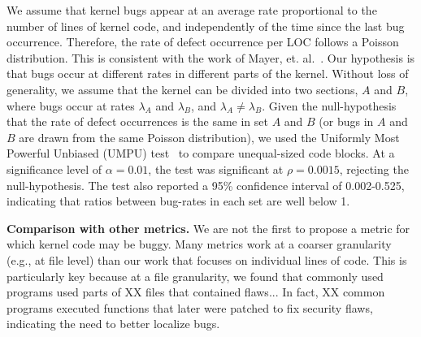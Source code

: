 We assume that kernel bugs appear at an average rate proportional to the
number of lines of kernel code, and independently of the time since the last
bug occurrence. Therefore, the rate of defect occurrence per LOC
follows a Poisson distribution.
This is consistent with the work of Mayer, et. al.~\cite{mayer1989probability}.
Our hypothesis is that bugs occur at different rates in different parts of the kernel. Without
loss of generality, we assume that the kernel can be divided into two sections,
$A$ and $B$, where bugs occur at rates $\lambda_A$ and
$\lambda_B$, and $\lambda_A \neq \lambda_B$. Given the null-hypothesis
that the rate of defect occurrences is the same in set $A$ and $B$
(or bugs in $A$ and $B$ are drawn from the same Poisson distribution),
we used the Uniformly Most Powerful Unbiased (UMPU) test~\cite{shiue1982experiment}
to compare unequal-sized code blocks.
At a significance level of $\alpha=0.01$, the test was significant at
$\rho=0.0015$, rejecting the null-hypothesis.
The test also reported a 95\% confidence interval of
0.002-0.525, indicating that ratios between bug-rates in each set are well
below 1. 

\textbf{Comparison with other metrics.}
We are not the first to propose a metric for which kernel code may be buggy.
Many metrics work at a coarser granularity (e.g., at file level) than our work that focuses on
individual lines of code.  This is particularly key because at a file
granularity, we found that commonly used programs used parts of
XX files that contained flaws...  In fact, XX common
programs executed functions that later were patched to fix security
flaws, indicating the need to better localize bugs.

